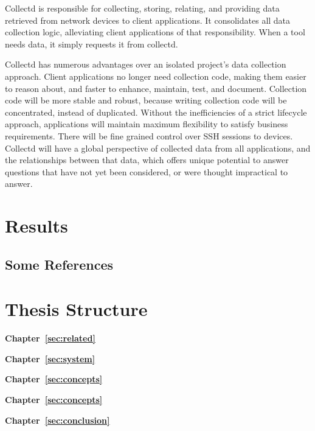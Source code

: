 Collectd is responsible for collecting, storing, relating, and providing data retrieved 
from network devices to client applications. It consolidates all data 
collection logic, alleviating client applications of that responsibility.
When a tool needs data, it simply requests it from collectd. 

Collectd has numerous advantages over an isolated project's data collection approach. 
Client applications no longer need collection code, making them easier to reason
about, and faster to enhance, maintain, test, and document. Collection code will
be more stable and robust, because writing collection code will be concentrated,
instead of duplicated. Without the inefficiencies of a strict lifecycle approach, 
applications will maintain maximum flexibility to satisfy business requirements.
There will be fine grained control over SSH sessions to devices. Collectd will
have a global perspective of collected data from all applications, and the 
relationships between that data, which offers unique potential to answer 
questions that have not yet been considered, or were thought impractical to 
answer.
\Blindtext[3][1]~\cite{Jurgens:2000,Jurgens:1995,Miede:2011,Kohm:2011,Apple:keynote:2010,Apple:numbers:2010,Apple:pages:2010}

\section{Results}
\label{sec:intro:results}

\Blindtext[1][2]

\subsection{Some References}
\label{sec:intro:results:refs}
\cite{WEB:GNU:GPL:2010,WEB:Miede:2011}

\section{Thesis Structure}
\label{sec:intro:structure}

\textbf{Chapter~\ref{sec:related}} \\[0.2em]
\blindtext{}

\textbf{Chapter~\ref{sec:system}} \\[0.2em]
\blindtext{}

\textbf{Chapter~\ref{sec:concepts}} \\[0.2em]
\blindtext{}

\textbf{Chapter~\ref{sec:concepts}} \\[0.2em]
\blindtext{}

\textbf{Chapter~\ref{sec:conclusion}} \\[0.2em]
\blindtext{}

